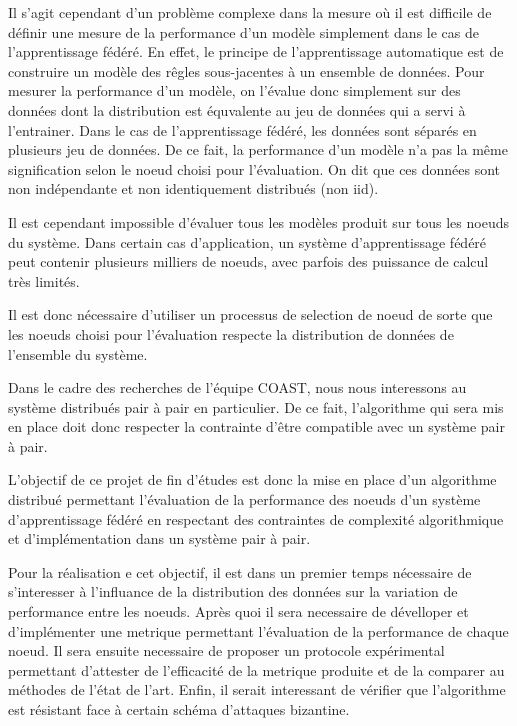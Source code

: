 \documentclass[stage3a]{tnreport} %
\begin{document}
Il s'agit cependant d'un problème complexe dans la mesure où il est difficile de définir une mesure de la performance d'un modèle simplement dans le cas de l'apprentissage fédéré. En effet, le principe de l'apprentissage automatique est de construire un modèle des rêgles sous-jacentes à un ensemble de données. Pour mesurer la performance d'un modèle, on l'évalue donc simplement sur des données dont la distribution est équvalente au jeu de données qui a servi à l'entrainer.  Dans le cas de l'apprentissage fédéré, les données sont séparés en plusieurs jeu de données. De ce fait, la performance d'un modèle n'a pas la même signification selon le noeud choisi pour l'évaluation. On dit que ces données sont non indépendante et non identiquement distribués (non iid).


Il est cependant impossible d'évaluer tous les modèles produit sur tous les noeuds du système. Dans certain cas d'application, un système d'apprentissage fédéré peut contenir plusieurs milliers de noeuds, avec parfois des puissance de calcul très limités. 

Il est donc  nécessaire d'utiliser un processus de selection de noeud de sorte que les noeuds choisi pour l'évaluation respecte la distribution de données de l'ensemble du système. %
 



Dans le cadre des recherches de l'équipe COAST, nous nous interessons au système distribués pair à pair en particulier. De ce fait, l'algorithme qui sera mis en place doit donc respecter la contrainte d'être compatible avec un système pair à pair.

L'objectif de ce projet de fin d'études est donc la mise en place d'un algorithme distribué permettant l'évaluation de la performance des noeuds d'un système d'apprentissage fédéré en respectant des contraintes de complexité algorithmique et d'implémentation dans un système pair à pair.  

Pour la réalisation e cet objectif, il est dans un premier temps nécessaire de s'interesser à l'influance de la distribution des données sur la variation de performance entre les noeuds. Après quoi il sera necessaire de dévelloper et d'implémenter une metrique permettant l'évaluation de la performance de chaque noeud. Il sera ensuite necessaire de proposer un protocole expérimental permettant d'attester de l'efficacité de la metrique produite et de la comparer au méthodes de l'état de l'art. Enfin, il serait interessant de vérifier que l'algorithme est résistant face à certain schéma d'attaques bizantine.
\end{document}
